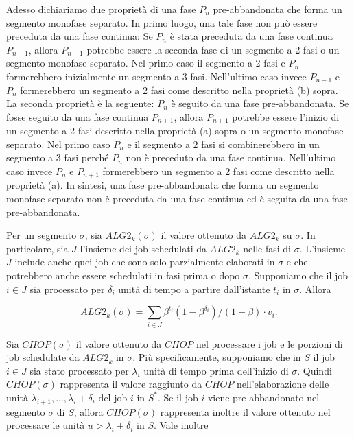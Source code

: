 \documentclass[twoside,openany,titlepage,fleqn,
	headinclude,12pt,a4paper,BCOR5mm,footinclude]{scrbook}
\begin{document}
Adesso dichiariamo due proprietà di una fase $P_{n}$ pre-abbandonata che forma un segmento monofase separato. In primo luogo, una tale fase non può essere preceduta da una fase continua: Se $P_{n}$ è stata preceduta da una fase continua $P_{n-1}$, allora $P_{n-1}$ potrebbe essere la seconda fase di un segmento a 2 fasi o un segmento monofase separato. Nel primo caso il segmento a 2 fasi e $P_{n}$ formerebbero inizialmente un segmento a 3 fasi. Nell'ultimo caso invece $P_{n-1}$ e $P_{n}$ formerebbero un segmento a 2 fasi come descritto nella proprietà (b) sopra. La seconda proprietà è la seguente: $P_{n}$ è seguito da una fase pre-abbandonata. Se fosse seguito da una fase continua $P_{n+1}$, allora $P_{n+1}$ potrebbe essere l'inizio di un segmento a 2 fasi descritto nella proprietà (a) sopra o un segmento monofase separato. Nel primo caso $P_{n}$ e il segmento a 2 fasi si combinerebbero in un segmento a 3 fasi perché $P_{n}$ non è preceduto da una fase continua. Nell'ultimo caso invece $P_{n}$ e $P_{n+1}$ formerebbero un segmento a 2 fasi come descritto nella proprietà (a). In sintesi, una fase pre-abbandonata che forma un segmento monofase separato non è preceduta da una fase continua ed è seguita da una fase pre-abbandonata.

Per un segmento $\sigma$, sia $ALG2_{k}(\sigma)$ il valore ottenuto da $ALG2_{k}$ su $\sigma$. In particolare, sia $J$ l'insieme dei job schedulati da $ALG2_{k}$ nelle fasi di $\sigma$. L'insieme $J$ include anche quei job che sono solo parzialmente elaborati in $\sigma$ e che potrebbero anche essere schedulati in fasi prima o dopo $\sigma$. Supponiamo che il job $i \in J$ sia processato per $\delta_{i}$ unità di tempo a partire dall'istante $t_{i}$ in $\sigma$. Allora

$$ALG2_{k}(\sigma) = \sum_{i \in J} \beta^{t_{i}}(1 - \beta^{\delta_{i}})/(1 - \beta) \cdot v_{i}.$$

Sia $CHOP(\sigma)$ il valore ottenuto da $CHOP$ nel processare i job  e le porzioni di job schedulate da $ALG2_{k}$ in $\sigma$. Più specificamente, supponiamo che in $S$ il job $i \in J$ sia stato processato per $\lambda_{i}$ unità di tempo prima dell'inizio di $\sigma$. Quindi $CHOP(\sigma)$ rappresenta il valore raggiunto da $CHOP$ nell'elaborazione delle unità $\lambda_{i +1}, ..., \lambda_{i} + \delta_{i}$ del job $i$ in $S^{*}$. Se il job $i$ viene pre-abbandonato nel segmento $\sigma$ di $S$, allora $CHOP(\sigma)$ rappresenta inoltre il valore ottenuto nel processare le unità $u > \lambda_{i} + \delta_{i}$ in $S$. Vale inoltre
\end{document}

